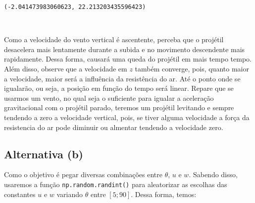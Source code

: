 \documentclass[12pt, a4paper]{article}
\makeatletter
\newcommand{\boxspacing}{\kern\kvtcb@left@rule\kern\kvtcb@boxsep}
\newcommand{\prompt}[4]{
        {\ttfamily\llap{{\color{#2}[#3]:\hspace{3pt}#4}}\vspace{-\baselineskip}}
    }
\makeatother
\begin{document}
            \begin{tcolorbox}[breakable, size=fbox, boxrule=.5pt, pad at break*=1mm, opacityfill=0]
\prompt{Out}{outcolor}{16}{\boxspacing}
\begin{Verbatim}[commandchars=\\\{\}]
(-2.041473983060623, 22.213203435596423)
\end{Verbatim}
\end{tcolorbox}
        
    \begin{center}
    \end{center}
    { \hspace*{\fill} \\}
    
    Como a velocidade do vento vertical é ascentente, perceba que o projétil
desacelera mais lentamente durante a subida e no movimento descendente
mais rapidamente. Dessa forma, causará uma queda do projétil em mais
tempo tempo. Além disso, observe que a velocidade em \(z\) também
converge, pois, quanto maior a velocidade, maior será a influência da
resistência do ar. Até o ponto onde se igualarão, ou seja, a posição em
função do tempo será linear. Repare que se usarmos um vento, no qual
seja o suficiente para igualar a aceleração gravitacional com o projétil
parado, teremos um projétil levitando e sempre tendendo a zero a
velocidade vertical, pois, se tiver alguma velocidade a força da
resistencia do ar pode diminuir ou almentar tendendo a velocidade zero.

\hypertarget{alternativa-b}{%
\subsection{Alternativa (b)}\label{alternativa-b}}

Como o objetivo é pegar diversas combinações entre \(\theta\), \(u\) e
\(w\). Sabendo disso, usaremos a função \texttt{np.random.randint()}
para aleatorizar as escolhas das constantes \(u\) e \(w\) variando
\(\theta\) entre \([5; 90]\). Dessa forma, temos:
\end{document}
